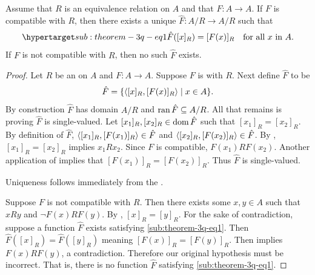 \documentclass{report}
\begin{document}
\subsection{}%

  \begin{theorem}[3Q]
    Assume that $R$ is an equivalence relation on $A$ and that
      $F \colon A \rightarrow A$.
    If $F$ is compatible with $R$, then there exists a unique
      $\hat{F} \colon A / R \rightarrow A / R$ such that
      \begin{equation}
        \hyperlabel{sub:theorem-3q-eq1}
        \hat{F}([x]_R) = [F(x)]_R \quad\text{for all } x \text{ in } A.
      \end{equation}
    If $F$ is not compatible with $R$, then no such $\hat{F}$ exists.
  \end{theorem}

  \begin{proof}
    Let $R$ be an  on $A$ and
      $F \colon A \rightarrow A$.
    Suppose $F$ is  with $R$.
    Next define  $\hat{F}$ to be
      $$\hat{F} = \{\left< [x]_R, [F(x)]_R \right> \mid x \in A\}.$$
    By construction $\hat{F}$ has domain $A / R$ and
      $\mathop{\text{ran}}{\hat{F}} \subseteq A / R$.
    All that remains is proving $\hat{F}$ is single-valued.
    Let $[x_1]_R, [x_2]_R \in \mathop{\text{dom}}{\hat{F}}$ such that $[x_1]_R = [x_2]_R$.
    By definition of $\hat{F}$, $\left< [x_1]_R, [F(x_1)]_R \right> \in \hat{F}$
      and $\left< [x_2]_R, [F(x_2)]_R \right> \in \hat{F}$.
    By , $[x_1]_R = [x_2]_R$ implies $x_1Rx_2$.
    Since $F$ is compatible, $F(x_1)RF(x_2)$.
    Another application of  implies that
      $[F(x_1)]_R = [F(x_2)]_R$.
    Thus $\hat{F}$ is single-valued.

    Uniqueness follows immediately from the .

    \suitdivider

    Suppose $F$ is not compatible with $R$.
    Then there exists some $x, y \in A$ such that $xRy$ and $\neg F(x)RF(y)$.
    By , $[x]_R = [y]_R$.
    For the sake of contradiction, suppose a function $\hat{F}$ exists
      satisfying \eqref{sub:theorem-3q-eq1}.
    Then $\hat{F}([x]_R) = \hat{F}([y]_R)$ meaning $[F(x)]_R = [F(y)]_R$.
    Then  implies $F(x)RF(y)$, a contradiction.
    Therefore our original hypothesis must be incorrect.
    That is, there is no function $\hat{F}$ satisfying
      \eqref{sub:theorem-3q-eq1}.
  \end{proof}
\end{document}
